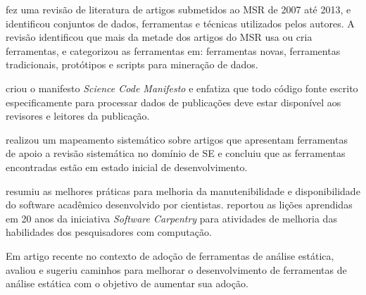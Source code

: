 fez uma revisão de literatura de artigos submetidos ao MSR de 2007 até 2013,
e identificou conjuntos de dados, ferramentas e técnicas utilizados pelos autores.
A revisão identificou que mais da metade dos artigos do MSR usa ou cria ferramentas,
e categorizou as ferramentas em:
ferramentas novas, ferramentas tradicionais, protótipos e scripts para
mineração de dados.

criou o manifesto {\it Science Code Manifesto} e enfatiza que todo código fonte
escrito especificamente para processar dados de publicações deve estar
disponível aos revisores e leitores da publicação.

 realizou um mapeamento sistemático sobre 
artigos que apresentam ferramentas de apoio a revisão sistemática no domínio de SE 
e concluiu que as
ferramentas encontradas estão em estado inicial de desenvolvimento.

 resumiu as melhores práticas para melhoria da
manutenibilidade e disponibilidade do software acadêmico desenvolvido por
cientistas.
 reportou
as lições aprendidas em 20 anos da iniciativa {\it Software Carpentry} 
para atividades de melhoria das
habilidades dos pesquisadores com computação.

Em artigo recente no contexto de adoção de ferramentas de análise estática,
 avaliou e sugeriu caminhos 
para melhorar o desenvolvimento de ferramentas de análise estática 
com o objetivo de aumentar sua adoção.




%

